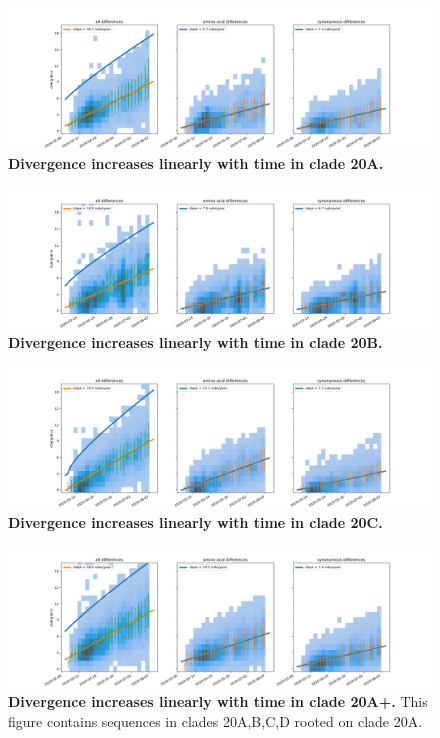 \begin{figure}
    \includegraphics[width=\textwidth]{figures/rtt/20A_rtt.png}
    \caption{{\bf Divergence increases linearly with time in clade 20A.}
    \label{fig:20A_divergence}}
\end{figure}

\begin{figure}
    \includegraphics[width=\textwidth]{figures/rtt/20B_rtt.png}
    \caption{{\bf Divergence increases linearly with time in clade 20B.}
    \label{fig:20B_divergence}}
\end{figure}

\begin{figure}
    \includegraphics[width=\textwidth]{figures/rtt/20C_rtt.png}
    \caption{{\bf Divergence increases linearly with time in clade 20C.}
    \label{fig:20C_divergence}}
\end{figure}


\begin{figure}
    \includegraphics[width=\textwidth]{figures/rtt/20A+_rtt.png}
    \caption{{\bf Divergence increases linearly with time in clade 20A+.}
    This figure contains sequences in clades 20A,B,C,D rooted on clade 20A.
    \label{fig:20A+_divergence}}
\end{figure}



